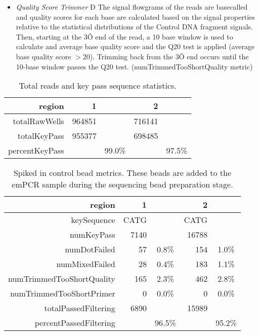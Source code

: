 \documentclass[11pt]{article}
\begin{document}
\begin{itemize}
\item \emph{Quality Score Trimmer} Ð The signal flowgrams of the reads are basecalled and quality scores for each base are calculated based on the signal properties relative to the statistical distributions of the Control DNA fragment signals. Then, starting at the 3Õ end of the read, a 10 base window is used to calculate and average base quality score and the Q20 test is applied (average base quality score $> 20$). Trimming back from the 3Õ end occurs until the 10-base window passes the Q20 test. (numTrimmedTooShortQuality metric)

\end{itemize}


\begin{table}[ht]
\begin{center}
\begin{tabular}{rrc|rc}
  \hline
region & 1 &	 & 2 & \\
  \hline
totalRawWells & 964851 && 716141 &\\
totalKeyPass & 955377& & 698485 &\\
percentKeyPass && 99.0\% & &97.5\% \\  
   \hline
\end{tabular}
\caption{Total reads and key pass sequence statistics.}
\label{table1}
\end{center}
\end{table}

\begin{table}[ht]
\begin{center}
\begin{tabular}{rrc|rc}
  \hline
region & 1	 & & 2 & \\
  \hline
keySequence & CATG & &CATG & \\
numKeyPass & 7140 & & 16788 & \\
numDotFailed & 57 & 0.8\% & 154 & 1.0\%  \\
numMixedFailed & 28 & 0.4\%  & 183 & 1.1\%  \\
numTrimmedTooShortQuality & 165 & 2.3\%  & 462 & 2.8\%  \\
numTrimmedTooShortPrimer &  0 & 0.0\% & 0 & 0.0\% \\
totalPassedFiltering & 6890 & &15989 & \\
percentPassedFiltering & &96.5\% && 95.2\%  \\
   \hline
\end{tabular}
\caption{Spiked in control bead metrics. These beads are added to the emPCR sample during the sequencing bead preparation stage.}
\label{table2}
\end{center}
\end{table}
\end{document}
